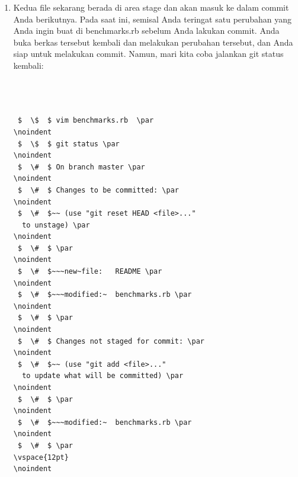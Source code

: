 \begin{enumerate}
\begin{verbatim}
 $  \$  $ git add benchmarks.rb \par
\noindent 
 $  \$  $ git status \par
\noindent 
 $  \#  $ On branch master \par
\noindent 
 $  \#  $ Changes to be committed: \par
\noindent 
 $  \#  $~~ (use "git reset HEAD
  <file>..." to unstage) \par
\noindent 
 $  \#  $ \par
\noindent 
 $  \#  $~~~new~file:   README \par
\noindent 
 $  \#  $~~~modified:~  benchmarks.rb \par
\noindent 
 $  \#  $ \par
\vspace{12pt}
\vspace{12pt}
\vspace{12pt}
\noindent 

\end{verbatim}

\item Kedua file sekarang berada di area stage dan akan masuk ke dalam commit Anda berikutnya. Pada saat ini, semisal Anda teringat satu perubahan yang Anda ingin buat di benchmarks.rb sebelum Anda lakukan commit. Anda buka berkas tersebut kembali dan melakukan perubahan tersebut, dan Anda siap untuk melakukan commit. Namun, mari kita coba jalankan git status kembali: \par
\vspace{12pt}
\vspace{12pt}
\vspace{12pt}
\noindent 

\begin{verbatim}



 $  \$  $ vim benchmarks.rb  \par
\noindent 
 $  \$  $ git status \par
\noindent 
 $  \#  $ On branch master \par
\noindent 
 $  \#  $ Changes to be committed: \par
\noindent 
 $  \#  $~~ (use "git reset HEAD <file>..."
  to unstage) \par
\noindent 
 $  \#  $ \par
\noindent 
 $  \#  $~~~new~file:   README \par
\noindent 
 $  \#  $~~~modified:~  benchmarks.rb \par
\noindent 
 $  \#  $ \par
\noindent 
 $  \#  $ Changes not staged for commit: \par
\noindent 
 $  \#  $~~ (use "git add <file>..."
  to update what will be committed) \par
\noindent 
 $  \#  $ \par
\noindent 
 $  \#  $~~~modified:~  benchmarks.rb \par
\noindent 
 $  \#  $ \par
\vspace{12pt}
\noindent 
\end{verbatim}



\end{enumerate}
